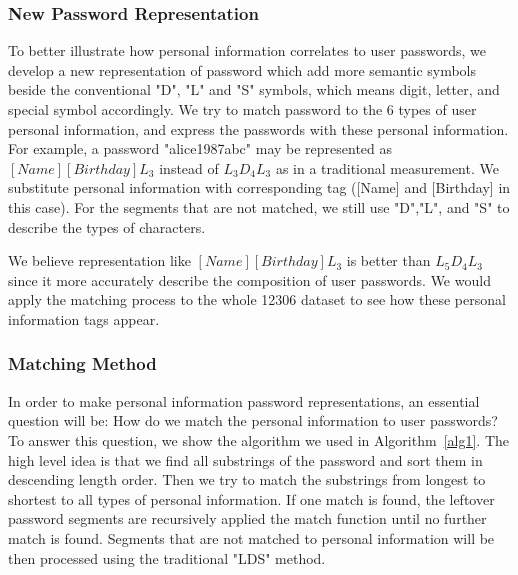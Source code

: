 \documentclass{sig-alternate}
\begin{document}
\subsubsection{New Password Representation}
To better illustrate how personal information correlates to user passwords, we develop a new representation of password which add more semantic symbols beside the conventional "D", "L" and "S" symbols, which means digit, letter, and special symbol accordingly. We try to match password to the 6 types of user personal information, and express the passwords with these personal information. For example, a password "alice1987abc" may be represented as $[Name][Birthday]L_3$ instead of $L_3D_4L_3$ as in a traditional measurement. We substitute personal information with corresponding tag ([Name] and [Birthday] in this case). For the segments that are not matched, we still use "D","L", and "S" to describe the types of characters.

We believe representation like $[Name][Birthday]L_3$ is better than $L_5D_4L_3$ since it more accurately describe the composition of user passwords. We would apply the matching process to the whole 12306 dataset to see how these personal information tags appear.

\subsubsection{Matching Method}
\label{matchingmethod}
In order to make personal information password representations, an essential question will be: How do we match the personal information to user passwords? To answer this question, we show the algorithm we used in Algorithm~\ref{alg1}. The high level idea is that we find all substrings of the password and sort them in descending length order. Then we try to match the substrings from longest to shortest to all types of personal information. If one match is found, the leftover password segments are recursively applied the match function until no further match is found. Segments that are not matched to personal information will be then processed using the traditional "LDS" method.
\end{document}
